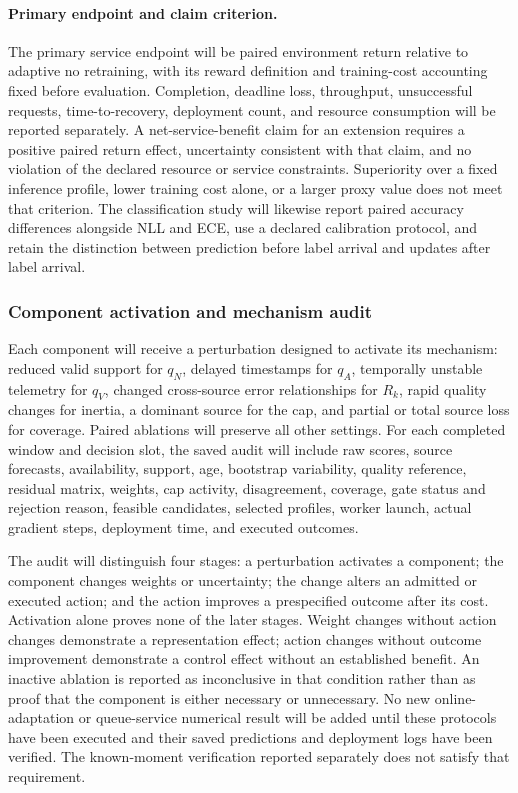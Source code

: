 \paragraph{Primary endpoint and claim criterion.}
The primary service endpoint will be paired environment return relative to
adaptive no retraining, with its reward definition and training-cost accounting
fixed before evaluation. Completion, deadline loss, throughput, unsuccessful
requests, time-to-recovery, deployment count, and resource consumption will be
reported separately. A net-service-benefit claim for an extension requires a
positive paired return effect, uncertainty consistent with that claim, and no
violation of the declared resource or service constraints. Superiority over a
fixed inference profile, lower training cost alone, or a larger proxy value does
not meet that criterion. The classification study will likewise report paired
accuracy differences alongside NLL and ECE, use a declared calibration protocol,
and retain the distinction between prediction before label arrival and updates
after label arrival.

\subsubsection{Component activation and mechanism audit}
\label{sec:validation-mechanisms}

Each component will receive a perturbation designed to activate its mechanism:
reduced valid support for $q_N$, delayed timestamps for $q_A$, temporally unstable
telemetry for $q_V$, changed cross-source error relationships for $R_k$, rapid
quality changes for inertia, a dominant source for the cap, and partial or total
source loss for coverage. Paired ablations will preserve all other settings.
For each completed window and decision slot, the saved audit will include raw
scores, source forecasts, availability, support, age, bootstrap variability,
quality reference, residual matrix, weights, cap activity, disagreement,
coverage, gate status and rejection reason, feasible candidates, selected profiles,
worker launch, actual gradient steps, deployment time, and executed outcomes.

The audit will distinguish four stages: a perturbation activates a component;
the component changes weights or uncertainty; the change alters an admitted or
executed action; and the action improves a prespecified outcome after its cost.
Activation alone proves none of the later stages. Weight changes without action
changes demonstrate a representation effect; action changes without outcome
improvement demonstrate a control effect without an established benefit.
An inactive ablation is reported as inconclusive in that condition rather than
as proof that the component is either necessary or unnecessary. No new online-adaptation or queue-service numerical result will be added until
these protocols have been executed and their saved predictions and deployment
logs have been verified. The known-moment verification reported separately does
not satisfy that requirement.



